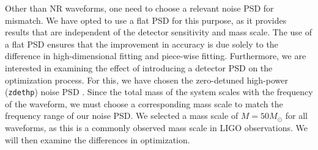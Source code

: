 \documentclass[twocolumn]{aastex631}
\newcommand{\zdethp}{\texttt{zdethp}}
\begin{document}
Other than NR waveforms, one need to choose a relevant noise PSD for 
mismatch. We have opted to use a flat PSD for this purpose, as it provides results that are independent of the detector sensitivity and mass scale. The use of a flat PSD ensures that the improvement in accuracy is due solely to the difference in high-dimensional fitting and piece-wise fitting. Furthermore, we are interested in examining the effect of introducing a detector PSD on the optimization process. For this, we have chosen the zero-detuned high-power (\zdethp) noise PSD \citep{aasi2015advanced}. Since the total mass of the system scales with the frequency of the waveform, we must choose a corresponding mass scale to match the frequency range of our noise PSD. We selected a mass scale of $M=50M_{\odot}$ for all waveforms, as this is a commonly observed mass scale in LIGO observations. We will then examine the differences in optimization.

\end{document}
